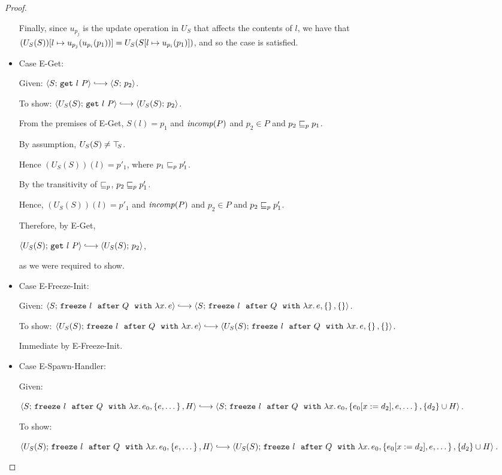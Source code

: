 \begin{proof}
\begin{itemize}
      Finally, since $u_{p_j}$ is the update operation in $U_S$ that
      affects the contents of $l$, we have that
      $(U_S(S))[l \mapsto u_{p_j}(u_{p_i}(p_1))] =
      U_S(S[l \mapsto u_{p_i}(p_1)])$, and so the case is
      satisfied.

    \item Case {\sc E-Get}:

      Given: $\config{S}{\getexp{l}{P}} \parstepsto \config{S}{p_2}$.

      To show: $\config{U_S(S)}{\getexp{l}{P}} \parstepsto
      \config{U_S(S)}{p_2}$.

      From the premises of {\sc E-Get}, $S(l) = p_1$ and $\mathit{incomp}(P)$
      and $p_2 \in P$ and $p_2 \sqsubseteq_p p_1$.

      By assumption, $U_S(S) \neq \top\hspace{-0.85mm}_{S}$.

      Hence $(U_S(S))(l) = p'_1$, where $p_1 \sqsubseteq_p p'_1$.

      By the transitivity of $\sqsubseteq_p$, $p_2 \sqsubseteq_p p'_1$.

      Hence, $(U_S(S))(l) = p'_1$ and $\mathit{incomp}(P)$ and $p_2 \in P$ and
      $p_2 \sqsubseteq_p p'_1$.

      Therefore, by {\sc E-Get},

      $\config{U_S(S)}{\getexp{l}{P}} \parstepsto
      \config{U_S(S)}{p_2}$,

      as we were required to show.

    \item Case {\sc E-Freeze-Init}:

      Given: $\config{S}{\freezeafter{l}{Q}{\lam{x}{e}}} \parstepsto
      \config{S}{\freezeafterfull{l}{Q}{\lam{x}{e}}{\setof{}}{\setof{}}}$.

      To show: $\config{U_S(S)}{\freezeafter{l}{Q}{\lam{x}{e}}}
      \parstepsto
      \config{U_S(S)}{\freezeafterfull{l}{Q}{\lam{x}{e}}{\setof{}}{\setof{}}}$.

      Immediate by {\sc E-Freeze-Init}.

    \item Case {\sc E-Spawn-Handler}:

      Given:

      $\config{S}{\freezeafterfull{l}{Q}{\lam{x}{e_0}}{\setof{e,
            \dots}}{H}} \parstepsto
      \config{S}{\freezeafterfull{l}{Q}{\lam{x}{e_0}}{\setof{\subst{e_0}{x}{d_2},
            e, \dots}} {\{d_2\}\cup H}}$.

      To show:

      $\config{U_S(S)}{\freezeafterfull{l}{Q}{\lam{x}{e_0}}{\setof{e,
            \dots}}{H}} \parstepsto
      \config{U_S(S)}{\freezeafterfull{l}{Q}{\lam{x}{e_0}}{\setof{\subst{e_0}{x}{d_2},
            e, \dots}} {\{d_2\}\cup H}}$.


\end{itemize}
\end{proof}
